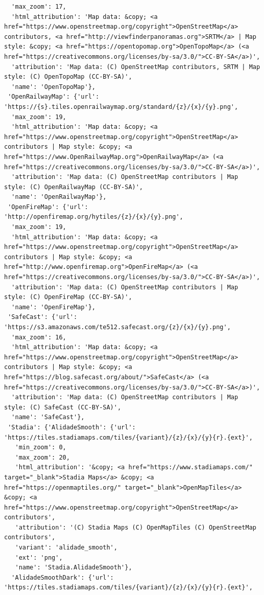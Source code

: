 \documentclass[
  letterpaper,
  DIV=11,
  numbers=noendperiod]{scrreprt}
\begin{document}
\begin{verbatim}
  'max_zoom': 17,
  'html_attribution': 'Map data: &copy; <a href="https://www.openstreetmap.org/copyright">OpenStreetMap</a> contributors, <a href="http://viewfinderpanoramas.org">SRTM</a> | Map style: &copy; <a href="https://opentopomap.org">OpenTopoMap</a> (<a href="https://creativecommons.org/licenses/by-sa/3.0/">CC-BY-SA</a>)',
  'attribution': 'Map data: (C) OpenStreetMap contributors, SRTM | Map style: (C) OpenTopoMap (CC-BY-SA)',
  'name': 'OpenTopoMap'},
 'OpenRailwayMap': {'url': 'https://{s}.tiles.openrailwaymap.org/standard/{z}/{x}/{y}.png',
  'max_zoom': 19,
  'html_attribution': 'Map data: &copy; <a href="https://www.openstreetmap.org/copyright">OpenStreetMap</a> contributors | Map style: &copy; <a href="https://www.OpenRailwayMap.org">OpenRailwayMap</a> (<a href="https://creativecommons.org/licenses/by-sa/3.0/">CC-BY-SA</a>)',
  'attribution': 'Map data: (C) OpenStreetMap contributors | Map style: (C) OpenRailwayMap (CC-BY-SA)',
  'name': 'OpenRailwayMap'},
 'OpenFireMap': {'url': 'http://openfiremap.org/hytiles/{z}/{x}/{y}.png',
  'max_zoom': 19,
  'html_attribution': 'Map data: &copy; <a href="https://www.openstreetmap.org/copyright">OpenStreetMap</a> contributors | Map style: &copy; <a href="http://www.openfiremap.org">OpenFireMap</a> (<a href="https://creativecommons.org/licenses/by-sa/3.0/">CC-BY-SA</a>)',
  'attribution': 'Map data: (C) OpenStreetMap contributors | Map style: (C) OpenFireMap (CC-BY-SA)',
  'name': 'OpenFireMap'},
 'SafeCast': {'url': 'https://s3.amazonaws.com/te512.safecast.org/{z}/{x}/{y}.png',
  'max_zoom': 16,
  'html_attribution': 'Map data: &copy; <a href="https://www.openstreetmap.org/copyright">OpenStreetMap</a> contributors | Map style: &copy; <a href="https://blog.safecast.org/about/">SafeCast</a> (<a href="https://creativecommons.org/licenses/by-sa/3.0/">CC-BY-SA</a>)',
  'attribution': 'Map data: (C) OpenStreetMap contributors | Map style: (C) SafeCast (CC-BY-SA)',
  'name': 'SafeCast'},
 'Stadia': {'AlidadeSmooth': {'url': 'https://tiles.stadiamaps.com/tiles/{variant}/{z}/{x}/{y}{r}.{ext}',
   'min_zoom': 0,
   'max_zoom': 20,
   'html_attribution': '&copy; <a href="https://www.stadiamaps.com/" target="_blank">Stadia Maps</a> &copy; <a href="https://openmaptiles.org/" target="_blank">OpenMapTiles</a> &copy; <a href="https://www.openstreetmap.org/copyright">OpenStreetMap</a> contributors',
   'attribution': '(C) Stadia Maps (C) OpenMapTiles (C) OpenStreetMap contributors',
   'variant': 'alidade_smooth',
   'ext': 'png',
   'name': 'Stadia.AlidadeSmooth'},
  'AlidadeSmoothDark': {'url': 'https://tiles.stadiamaps.com/tiles/{variant}/{z}/{x}/{y}{r}.{ext}',

\end{verbatim}
\end{document}
